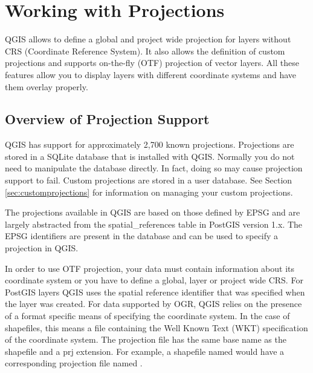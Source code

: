 
\section{Working with Projections}\label{label_projections}


QGIS allows to define a global and project wide projection for layers without
CRS (Coordinate Reference System). It also allows the definition of custom
projections and supports on-the-fly (OTF) projection of vector layers. All
these features allow you to display layers with different coordinate systems
and have them overlay properly.

\subsection{Overview of Projection Support}\label{label_projoverview}

QGIS has support for approximately 2,700 known projections. 
Projections are stored in a SQLite database that is installed with QGIS. 
Normally you do not need to manipulate the database directly. In fact,
doing so may cause projection support to fail. Custom projections are
stored in a user database. See Section \ref{sec:customprojections} for
information on managing your custom projections.

The projections available in QGIS are based on those defined by
EPSG and are largely abstracted from the spatial\_references 
table in PostGIS version 1.x. The EPSG identifiers are
present in the database and can be used to specify a projection in QGIS.

In order to use OTF projection, your data must contain information about its
coordinate system or you have to define a global, layer or project wide CRS.
For PostGIS layers QGIS uses the spatial reference identifier that was specified
when the layer was created. For data supported by OGR, QGIS relies on the
presence of a format specific means of specifying the coordinate system. In
the case of shapefiles, this means a file containing the Well Known Text
(WKT) specification of the coordinate system. The projection file
has the same base name as the shapefile and a prj extension. For example, a
shapefile named  would have a corresponding projection
file named .

